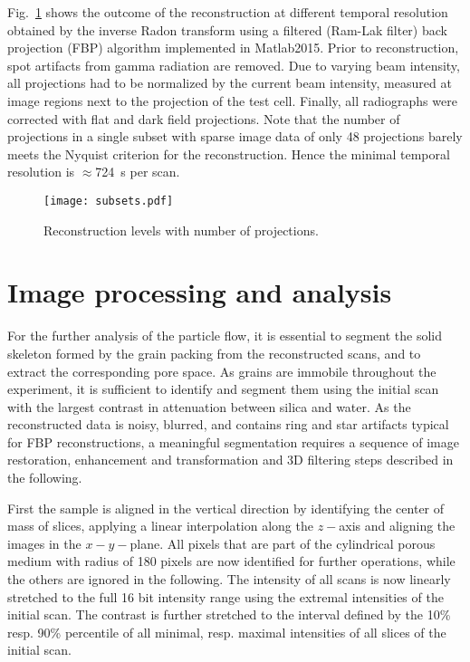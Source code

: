 \documentclass[smallextended]{svjour3}       %
\begin{document}
Fig.~\ref{fig:subsets} shows the outcome of the reconstruction at different temporal resolution obtained by the inverse Radon transform using a filtered (Ram-Lak filter) back projection (FBP) algorithm \cite{ct-ref-88} implemented in Matlab2015. Prior to reconstruction, spot artifacts from gamma radiation are removed. Due to varying beam intensity, all projections had to be normalized by the current beam intensity, measured at image regions next to the projection of the test cell. Finally, all radiographs were corrected with flat and dark field projections. Note that the number of projections in a single subset with sparse image data of only 48 projections barely meets the Nyquist criterion \cite{ct-ref-88} for the reconstruction. Hence the minimal temporal resolution is $\approx$724~s per scan.
\begin {figure}[!hbtp]
\texttt{[image: subsets.pdf]}
\caption{\label{fig:subsets} Reconstruction levels with number of projections.}
\end{figure}
\section{Image processing and analysis}\label{sec:imageprocessing}
For the further analysis of the particle flow, it is essential to segment the solid skeleton formed by the grain packing from the reconstructed scans, and to extract the corresponding pore space. As grains are immobile throughout the experiment, it is sufficient to identify and segment them using the initial scan with the largest contrast in attenuation between silica and water. As the reconstructed data is noisy, blurred, and contains ring and star artifacts typical for FBP reconstructions, a meaningful segmentation requires a sequence of image restoration, enhancement and transformation and 3D filtering steps described in the following.

First the sample is aligned in the vertical direction by identifying the center of mass of slices, applying a linear interpolation along the $z-$axis and aligning the images in the $x-y-$plane. All pixels that are part of the cylindrical porous medium with radius of 180 pixels are now identified for further operations, while the others are ignored in the following. The intensity of all scans is now linearly stretched to the full 16 bit intensity range using the extremal intensities of the initial scan. The contrast is further stretched to the interval defined by the 10\% resp. 90\% percentile of all minimal, resp. maximal intensities of all slices of the initial scan. 
\end{document}
